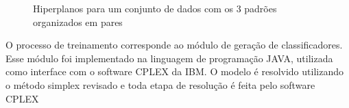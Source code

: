 \begin{figure}[h!]
\centering
{}
\qquad
{}
\qquad
{}
\label{img:class_separados}
\caption{Hiperplanos para um conjunto de dados com os 3 padrões organizados em pares}
\end{figure}

O processo de treinamento corresponde ao módulo de geração de classificadores. Esse módulo foi implementado na linguagem de programação JAVA, utilizada como interface com o software CPLEX da IBM. O modelo é resolvido utilizando o método simplex revisado e toda etapa de resolução é feita pelo software CPLEX

